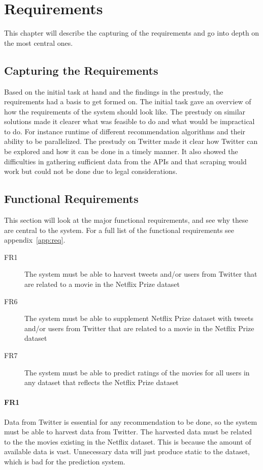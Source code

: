 
\chapter{Requirements}

\minitoc

This chapter will describe the capturing of the requirements and go into depth on the most central ones.

\clearpage

\section{Capturing the Requirements}
Based on the initial task at hand and the findings in the prestudy, the requirements had a basis to get formed on. The initial task gave an overview of how the requirements of the system should look like. The prestudy on similar solutions made it clearer what was feasible to do and what would be impractical to do. For instance runtime of different recommendation algorithms and their ability to be parallelized. The prestudy on Twitter made it clear how Twitter can be explored and how it can be done in a timely manner. It also showed the difficulties in gathering sufficient data from the APIs and that scraping would work but could not be done due to legal considerations.

\section{Functional Requirements}\label{section:functional-requirements}
This section will look at the major functional requirements, and see why these are central to the system. For a full list of the functional requirements see appendix~\ref{app:req}.
\begin{description}
  \item[FR1] The system must be able to harvest tweets and/or users from Twitter that are related to a movie in the Netflix Prize dataset
  \item[FR6] The system must be able to supplement Netflix Prize dataset with tweets and/or users from Twitter that are related to a movie in the Netflix Prize dataset
  \item[FR7] The system must be able to predict ratings of the movies for all users in any dataset that reflects the Netflix Prize dataset
\end{description}

\subsubsection{FR1}
Data from Twitter is essential for any recommendation to be done, so the system must be able to harvest data from Twitter. The harvested data must be related to the the movies existing in the Netflix dataset. This is because the amount of available data is vast. Unnecessary data will just produce static to the dataset, which is bad for the prediction system.

